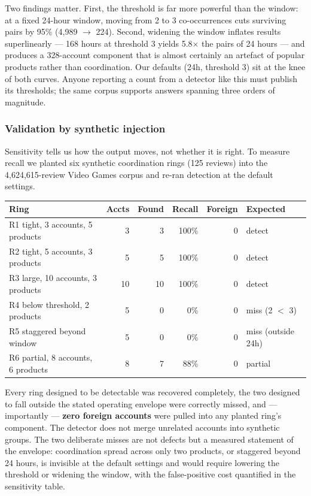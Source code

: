 \documentclass[12pt]{article}
\begin{document}
Two findings matter. First, the threshold is far more powerful than the
window: at a fixed 24-hour window, moving from 2 to 3 co-occurrences cuts
surviving pairs by 95\% (4{,}989 $\rightarrow$ 224). Second, widening the
window inflates results superlinearly --- 168 hours at threshold 3 yields
5.8$\times$ the pairs of 24 hours --- and produces a 328-account component
that is almost certainly an artefact of popular products rather than
coordination. Our defaults (24h, threshold 3) sit at the knee of both curves.
Anyone reporting a count from a detector like this must publish its thresholds;
the same corpus supports answers spanning three orders of magnitude.

\subsubsection{Validation by synthetic injection}

Sensitivity tells us how the output moves, not whether it is right. To measure
recall we planted six synthetic coordination rings (125 reviews) into the
4{,}624{,}615-review Video Games corpus and re-ran detection at the default
settings.

\begin{center}
\begin{tabular}{@{}lrrrrl@{}}
  \toprule
  \textbf{Ring} & \textbf{Accts} & \textbf{Found} & \textbf{Recall} &
  \textbf{Foreign} & \textbf{Expected} \\
  \midrule
  R1 tight, 3 accounts, 5 products   & 3  & 3  & 100\% & 0 & detect \\
  R2 tight, 5 accounts, 3 products   & 5  & 5  & 100\% & 0 & detect \\
  R3 large, 10 accounts, 3 products  & 10 & 10 & 100\% & 0 & detect \\
  R4 below threshold, 2 products     & 5  & 0  & 0\%   & 0 & miss (2 $<$ 3) \\
  R5 staggered beyond window         & 5  & 0  & 0\%   & 0 & miss (outside 24h) \\
  R6 partial, 8 accounts, 6 products & 8  & 7  & 88\%  & 0 & partial \\
  \bottomrule
\end{tabular}
\end{center}

Every ring designed to be detectable was recovered completely, the two
designed to fall outside the stated operating envelope were correctly missed,
and --- importantly --- \textbf{zero foreign accounts} were pulled into any
planted ring's component. The detector does not merge unrelated accounts into
synthetic groups. The two deliberate misses are not defects but a measured
statement of the envelope: coordination spread across only two products, or
staggered beyond 24 hours, is invisible at the default settings and would
require lowering the threshold or widening the window, with the
false-positive cost quantified in the sensitivity table.
\end{document}
